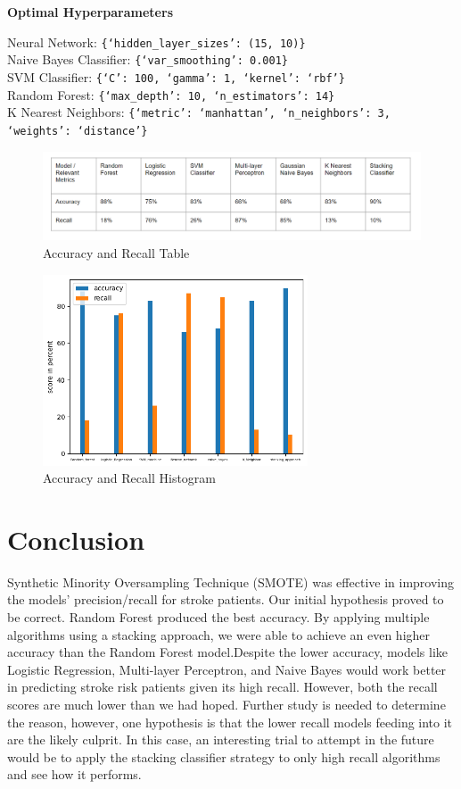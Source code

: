 \documentclass[11pt]{article}
\begin{document}
\textbf{Optimal Hyperparameters}

Neural Network: \texttt{\{`hidden\_layer\_sizes': (15, 10)\}} \\
Naive Bayes Classifier: \texttt{\{`var\_smoothing': 0.001\}} \\
SVM Classifier: \texttt{\{`C': 100, `gamma': 1, `kernel': `rbf'\}} \\
Random Forest: \texttt{\{`max\_depth': 10, `n\_estimators': 14\}} \\
K Nearest Neighbors: \texttt{\{`metric': `manhattan', `n\_neighbors': 3, `weights': `distance'\}}

\begin{figure}[ht]
\centering
\includegraphics[width=1\textwidth]{table.png}
\caption{Accuracy and Recall Table}
\end{figure}

\begin{figure}[ht]
\centering
\includegraphics[width=0.7\textwidth]{Models.png}
\caption{Accuracy and Recall Histogram}{}
\end{figure}

\section*{Conclusion}

Synthetic Minority Oversampling Technique (SMOTE) was effective in improving the models’ precision/recall for stroke patients. Our initial hypothesis proved to be correct. Random Forest produced the best accuracy. By applying multiple algorithms using a stacking approach, we were able to achieve an even higher accuracy than the Random Forest model.Despite the lower accuracy, models like Logistic Regression, Multi-layer Perceptron, and Naive Bayes would work better in predicting stroke risk patients given its high recall. However, both the recall scores are much lower than we had hoped. Further study is needed to determine the reason, however, one hypothesis is that the lower recall models feeding into it are the likely culprit. In this case, an interesting trial to attempt in the future would be to apply the stacking classifier strategy to only high recall algorithms and see how it performs.
\end{document}
